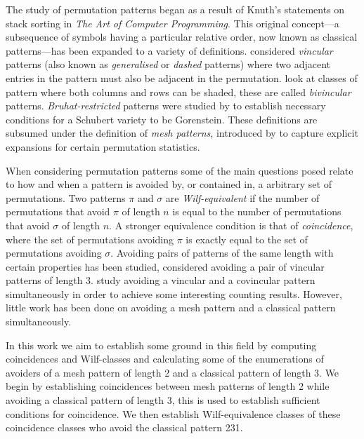 The study of permutation patterns began as a result of Knuth's statements on
stack sorting in \emph{The Art of Computer Programming}\cite[p.~243,
Ex.~5,6]{Knuth:1997:ACP:260999}. This original concept---a subsequence of
symbols having a particular relative order, now known as classical
patterns---has been expanded to a variety of definitions.
\textcite{babstein2000} considered \emph{vincular} patterns (also known as
\emph{generalised} or \emph{dashed} patterns) where two adjacent entries in the
pattern must also be adjacent in the permutation. \textcite{MR2652101} look at
classes of pattern where both columns and rows can be shaded, these are called
\emph{bivincular} patterns. \emph{Bruhat-restricted} patterns were studied by
\textcite{MR2264071} to establish necessary conditions for a Schubert variety to
be Gorenstein. These definitions are subsumed under the definition of \emph{mesh
patterns}, introduced by \textcite{journals/combinatorics/BrandenC11} to capture
explicit expansions for certain permutation statistics.

When considering permutation patterns some of the main questions posed relate to
how and when a pattern is avoided by, or contained in, a arbitrary set of
permutations. Two patterns \(\pi\) and \(\sigma\) are \emph{Wilf-equivalent} if
the number of permutations that avoid \(\pi\) of length \(n\) is equal to the
number of permutations that avoid \(\sigma\) of length \(n\). A stronger
equivalence condition is that of \emph{coincidence}, where the set of
permutations avoiding \(\pi\) is exactly equal to the set of permutations
avoiding \(\sigma\). Avoiding pairs of patterns of the same length with certain
properties has been studied, \textcite{MR2178749} considered avoiding
a pair of vincular patterns of length 3. \textcite{2015arXiv151203226B} study
avoiding a vincular and a covincular pattern simultaneously in order to achieve
some interesting counting results. However, little work has been done on
avoiding a mesh pattern and a classical pattern simultaneously.

In this work we aim to establish some ground in this field by computing
coincidences and Wilf-classes and calculating some of the enumerations of
avoiders of a mesh pattern of length 2 and a classical pattern of length 3. We
begin by establishing coincidences between mesh patterns of length 2 while
avoiding a classical pattern of length 3, this is used to establish sufficient
conditions for coincidence. We then establish Wilf-equivalence classes of these
coincidence classes who avoid the classical pattern 231.
